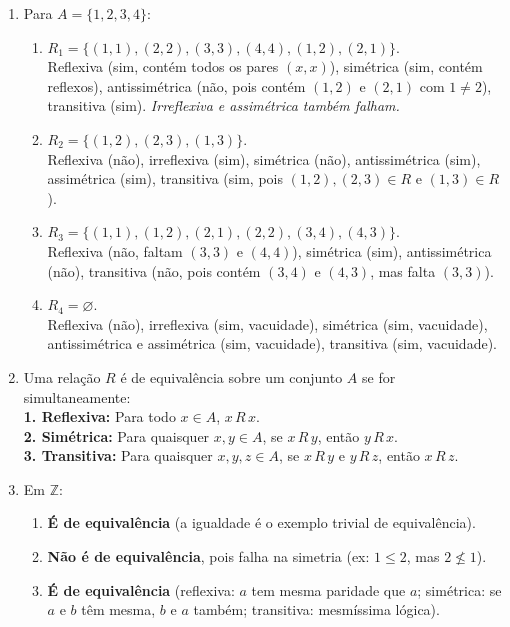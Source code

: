 \documentclass[12pt]{article}
\begin{document}
\begin{enumerate}
\item Para $A = \{1, 2, 3, 4\}$:
\begin{enumerate}[label=\alph*)]
    \item $R_1 = \{(1,1), (2,2), (3,3), (4,4), (1,2), (2,1)\}$.\\
    Reflexiva (sim, contém todos os pares $(x,x)$), simétrica (sim, contém reflexos), antissimétrica (não, pois contém $(1,2)$ e $(2,1)$ com $1 \ne 2$), transitiva (sim). \emph{Irreflexiva e assimétrica também falham.}
    \item $R_2 = \{(1,2), (2,3), (1,3)\}$.\\
    Reflexiva (não), irreflexiva (sim), simétrica (não), antissimétrica (sim), assimétrica (sim), transitiva (sim, pois $(1,2),(2,3) \in R$ e $(1,3) \in R$).
    \item $R_3 = \{(1,1), (1,2), (2,1), (2,2), (3,4), (4,3)\}$.\\
    Reflexiva (não, faltam $(3,3)$ e $(4,4)$), simétrica (sim), antissimétrica (não), transitiva (não, pois contém $(3,4)$ e $(4,3)$, mas falta $(3,3)$).
    \item $R_4 = \varnothing$.\\
    Reflexiva (não), irreflexiva (sim, vacuidade), simétrica (sim, vacuidade), antissimétrica e assimétrica (sim, vacuidade), transitiva (sim, vacuidade).
\end{enumerate}

\item Uma relação $R$ é de equivalência sobre um conjunto $A$ se for simultaneamente:\\
\textbf{1. Reflexiva:} Para todo $x \in A$, $x\,R\,x$.\\
\textbf{2. Simétrica:} Para quaisquer $x, y \in A$, se $x\,R\,y$, então $y\,R\,x$.\\
\textbf{3. Transitiva:} Para quaisquer $x, y, z \in A$, se $x\,R\,y$ e $y\,R\,z$, então $x\,R\,z$.

\item Em $\mathbb{Z}$:
\begin{enumerate}[label=\alph*)]
    \item \textbf{É de equivalência} (a igualdade é o exemplo trivial de equivalência).
    \item \textbf{Não é de equivalência}, pois falha na simetria (ex: $1 \le 2$, mas $2 \not\le 1$).
    \item \textbf{É de equivalência} (reflexiva: $a$ tem mesma paridade que $a$; simétrica: se $a$ e $b$ têm mesma, $b$ e $a$ também; transitiva: mesmíssima lógica).
\end{enumerate}


\end{enumerate}
\end{document}
